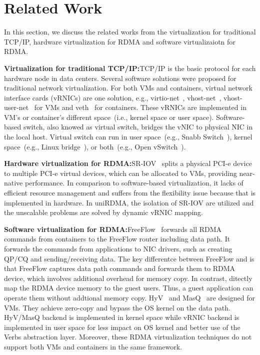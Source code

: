 \section{Related Work} \label{relatedwork}

In this section, we discuss the related works from the virtualization for traditional TCP/IP, hardware virtualization for RDMA and software virtualizaiotn for RDMA.

\textbf{Virtualization for traditional TCP/IP:}\quad TCP/IP is the basic protocol for each hardware node in data centers. Several software solutions were proposed for traditional network virtualization. For both VMs and containers, virtual network interface cards (vRNICs) are one solution, e.g., virtio-net~\cite{virtio-russell2008}, vhost-net~\cite{vhost-net},  vhost-user-net~\cite{vhost-user-net} for VMs and veth~\cite{veth} for containers. These vRNICs are implemented in VM's or container's different space~(i.e., kernel space or user space). Software-based switch, also knowed as virtual switch, bridges the vNIC to physical NIC in the local host. Virtual switch can run in user space~(e.g., Snabb Switch~\cite{snabb}), kernel space~(e.g., Linux bridge~\cite{linux-bridge}), or both~(e.g., Open vSwitch~\cite{ovs-2015}). 

\textbf{Hardware virtualization for RDMA:}\quad SR-IOV~\cite{sr-iov} splits a physical PCI-e device to multiple PCI-e virtual devices, which can be allocated to VMs, providing near-native performance. In comparison to software-based virtualization, it lacks of efficient resource management and suffers from the flexibility issue because that is implemented in hardware. In uniRDMA, the isolation of SR-IOV are utilized and the unscalable problems are solved by dynamic vRNIC mapping. 

\textbf{Software virtualization for RDMA:}\quad FreeFlow~\cite{kim2019freeflow} forwards all RDMA commands from containers to the FreeFlow router including data path. It forwards the commands from applications to NIC drivers, such as creating QP/CQ and sending/receiving data. The key differentce between FreeFlow and \sys is that FreeFlow captures data path commands and forwards them to RDMA device, which involves additional overhead for memory copy. In contrast, \sys ditectly map the RDMA device memory to the guest users. Thus, a guest application can operate them without addtional memory copy. HyV~\cite{pfefferle2015hybrid} and MasQ~\cite{he2020masq} are designed for VMs. They achieve zero-copy and bypass the OS kernel on the data path. HyV/MasQ backend is implemented in kernel space while \sys vRNIC backend is implemented in user space for less impact on OS kernel and better use of the Verbs abstraction layer. Moreover, these RDMA virtualization techniques do not support both VMs and containers in the same framework. 